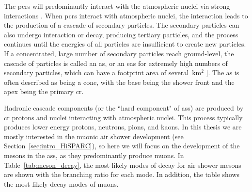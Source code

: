 The \glspl{pcr} will predominantly interact with the atmospheric nuclei via strong interactions \citep{grupen_astroparticle_2005}. When \glspl{pcr} interact with atmospheric nuclei, the interaction leads to the production of a cascade of secondary particles. The secondary particles can also undergo interaction or decay, producing tertiary particles, and the process continues until the energies of all particles are insufficient to create new particles. If a concentrated, large number of secondary particles reach ground-level, the cascade of particles is called an \gls{as}, or an \gls{eas} for extremely high numbers of secondary particles, which can have a footprint area of several~km$^2$ \cite{fokkema_hisparc_2012, van_dam_hisparc_2020}]. The \gls{as} is often described as being a cone, with the base being the shower front and the apex being the primary \gls{cr}.

Hadronic cascade components (or the ``hard component" of \glspl{as}) are produced by \gls{cr} protons and nuclei interacting with atmospheric nuclei. This process typically produces lower energy protons, neutrons, pions, and kaons. In this thesis we are mostly interested in the muonic air shower development (see Section~\ref{sec:intro_HiSPARC}), so here we will focus on the development of the mesons in the \glspl{as}, as they predominantly produce muons. In Table~\ref{tab:meson_decay}, the most likely modes of decay for air shower mesons are shown with the branching ratio for each mode. In addition, the table shows the most likely decay modes of muons.


